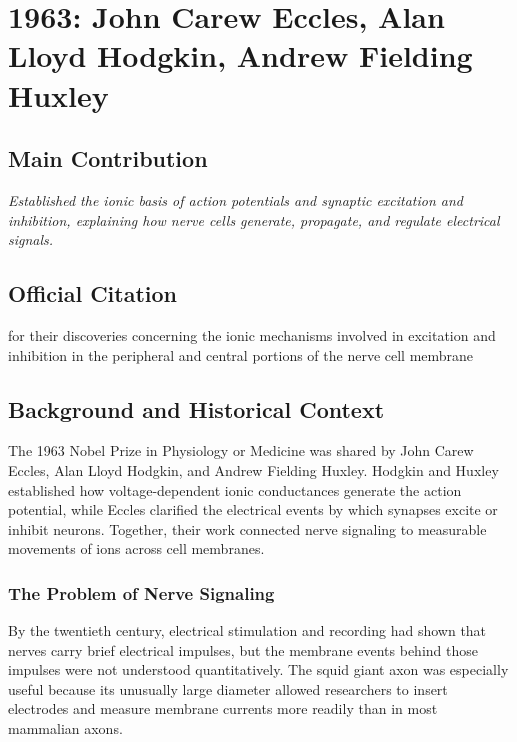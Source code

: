 \chapter[1963 --- Eccles, Hodgkin, and Huxley]{1963: John Carew Eccles, Alan Lloyd Hodgkin, Andrew Fielding Huxley}
\label{ch:1963_Eccles}

\section*{Main Contribution}

\textit{Established the ionic basis of action potentials and synaptic excitation and inhibition, explaining how nerve cells generate, propagate, and regulate electrical signals.}\cite{nobel-1963,lecture-1963,hodgkin-1963,huxley-1963}

\section{Official Citation}

for their discoveries concerning the ionic mechanisms involved in excitation and inhibition in the peripheral and central portions of the nerve cell membrane

\section{Background and Historical Context}

The 1963 Nobel Prize in Physiology or Medicine was shared by John Carew Eccles, Alan Lloyd Hodgkin, and Andrew Fielding Huxley. Hodgkin and Huxley established how voltage-dependent ionic conductances generate the action potential, while Eccles clarified the electrical events by which synapses excite or inhibit neurons. Together, their work connected nerve signaling to measurable movements of ions across cell membranes.

\subsection{The Problem of Nerve Signaling}

By the twentieth century, electrical stimulation and recording had shown that nerves carry brief electrical impulses, but the membrane events behind those impulses were not understood quantitatively. The squid giant axon was especially useful because its unusually large diameter allowed researchers to insert electrodes and measure membrane currents more readily than in most mammalian axons.


